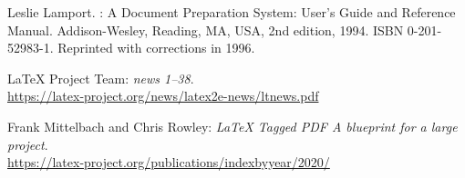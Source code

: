 \documentclass{ltnews}
\providecommand\Dash {\unskip \textemdash}
\begin{document}

\begin{thebibliography}{9}



Leslie Lamport.
\newblock {\LaTeX}: {A} Document Preparation System: User's Guide and Reference
  Manual.
\newblock \mbox{Addison}-Wesley, Reading, MA, USA, 2nd edition, 1994.
\newblock ISBN 0-201-52983-1.
\newblock Reprinted with corrections in 1996.


 \LaTeX{} Project Team:
  \emph{\LaTeXe{} news 1--38}.\\
  \url{https://latex-project.org/news/latex2e-news/ltnews.pdf}

 Frank Mittelbach and Chris Rowley:
  \emph{\LaTeX{} Tagged PDF \Dash A blueprint for a large project}.\\
  \url{https://latex-project.org/publications/indexbyyear/2020/}



\end{thebibliography}
\end{document}
